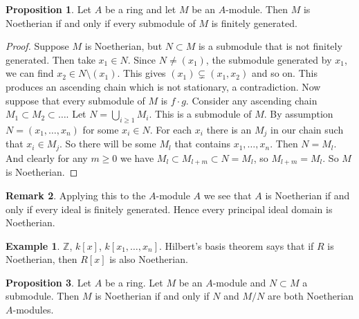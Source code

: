\documentclass{article}
\newcommand{\Z}{\mathbb{Z}}
\newcommand{\rb}[1]{\left( #1 \right)}
\renewcommand{\sb}[1]{\left[ #1 \right]}
\theoremstyle{definition}\newtheorem{definition}{Definition}[section]
\theoremstyle{definition}\newtheorem{remark}[definition]{Remark}
\theoremstyle{definition}\newtheorem*{example}{Example}
\theoremstyle{definition}\newtheorem*{note}{Note}
\newtheorem{proposition}[definition]{Proposition}
\begin{document}
\begin{proposition}
Let $ A $ be a ring and let $ M $ be an $ A $-module. Then $ M $ is Noetherian if and only if every submodule of $ M $ is finitely generated.
\end{proposition}

\begin{proof}
Suppose $ M $ is Noetherian, but $ N \subset M $ is a submodule that is not finitely generated. Then take $ x_1 \in N $. Since $ N \ne \rb{x_1} $, the submodule generated by $ x_1 $, we can find $ x_2 \in N \setminus \rb{x_1} $. This gives $ \rb{x_1} \subsetneq \rb{x_1, x_2} $ and so on. This produces an ascending chain which is not stationary, a contradiction. Now suppose that every submodule of $ M $ is $ f \cdot g $. Consider any ascending chain $ M_1 \subset M_2 \subset \dots $. Let $ N = \bigcup_{i \ge 1} M_i $. This is a submodule of $ M $. By assumption $ N = \rb{x_1, \dots, x_n} $ for some $ x_i \in N $. For each $ x_i $ there is an $ M_j $ in our chain such that $ x_i \in M_j $. So there will be some $ M_l $ that contains $ x_1, \dots, x_n $. Then $ N = M_l $. And clearly for any $ m \ge 0 $ we have $ M_l \subset M_{l + m} \subset N = M_l $, so $ M_{l + m} = M_l $. So $ M $ is Noetherian.
\end{proof}

\begin{remark}
Applying this to the $ A $-module $ A $ we see that $ A $ is Noetherian if and only if every ideal is finitely generated. Hence every principal ideal domain is Noetherian.
\end{remark}

\begin{example}
$ \Z $, $ k\sb{x} $, $ k\sb{x_1, \dots, x_n} $. Hilbert's basis theorem says that if $ R $ is Noetherian, then $ R\sb{x} $ is also Noetherian.
\end{example}

\begin{proposition}
\label{prop:10.4}
Let $ A $ be a ring. Let $ M $ be an $ A $-module and $ N \subset M $ a submodule. Then $ M $ is Noetherian if and only if $ N $ and $ M / N $ are both Noetherian $ A $-modules.
\end{proposition}
\end{document}
